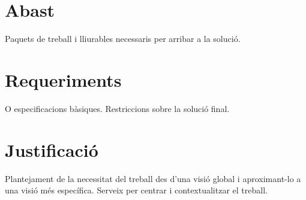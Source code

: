 \section{Abast}

Paquets de treball i lliurables necessaris per arribar a la solució.

\section{Requeriments}

O especificacions bàsiques. Restriccions sobre la solució final.

\section{Justificació}

Plantejament de la necessitat del treball des d’una visió global i aproximant-lo a una visió més específica. Serveix per centrar i contextualitzar el treball.